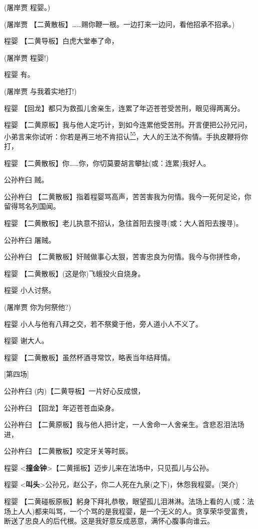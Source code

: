 (屠岸贾 程婴。)

(屠岸贾
【二黄散板】\ldots{}\ldots{}赐你鞭一根。一边打来一边问，看他招承不招承。)

程婴 【二黄导板】白虎大堂奉了命，

(屠岸贾 程婴!)

程婴 有。

(屠岸贾 与我着实地打!)

程婴 【回龙】都只为救孤儿舍亲生，连累了年迈苍苍受苦刑，眼见得两离分。

程婴
【二黄原板】我与他人定巧计，到如今连累他受苦刑。开言便把公孙兄问，小弟言来你试听：你若是再三地不肯招认\protect\hyperlink{fn55}{\textsuperscript{55}}，大人的王法不徇情。手执皮鞭将你打，

程婴
【二黄散板】你\ldots{}\ldots{}你，你切莫要胡言攀扯(或：连累)我好人。

公孙杵臼 贼。

公孙杵臼
【二黄散板】指着程婴骂高声，苦苦害我为何情。我今一死何足论，你留得骂名列国闻。

程婴 【二黄散板】老儿执意不招认，急往首阳去搜寻(或：大人首阳去搜寻)。

公孙杵臼 屠贼。

公孙杵臼 【二黄散板】奸贼做事心太狠，苦害忠良为何情。我今与你拼性命，

程婴 【二黄散板】(这是你)飞蛾投火自烧身。

程婴 小人讨祭。

(屠岸贾 你为何祭他?)

程婴 小人与他有八拜之交，若不祭奠于他，旁人道小人不义了。

程婴 谢大人。

程婴 【二黄散板】虽然杯酒寻常饮，略表当年结拜情。

{[}第四场{]}

公孙杵臼 (内)【二黄导板】一片好心反成恨，

公孙杵臼 【回龙】年迈苍苍血染身。

公孙杵臼
【二黄原板】我与他人把计定，一人舍命一人舍亲生。含悲忍泪法场进，

公孙杵臼 【二黄散板】咬定牙关等时辰。

程婴
\textless{}\textbf{撞金钟}\textgreater{}【二黄摇板】迈步儿来在法场中，只见孤儿与公孙。

程婴
\textless{}\textbf{叫头}\textgreater{}公孙兄，赵公子，你二人死在九泉(之下)，休怨我程婴。(哭介)

程婴
【二黄碰板原板】躬身下拜礼恭敬，眼望孤儿泪淋淋。法场上看的人(或：法场上人人)都来叫骂，一个个骂的是我程婴，是一个无义的人。贪享荣华受富贵，断送了忠良人的后代根。这是我好意反成恶意，满怀心腹事向谁云。

